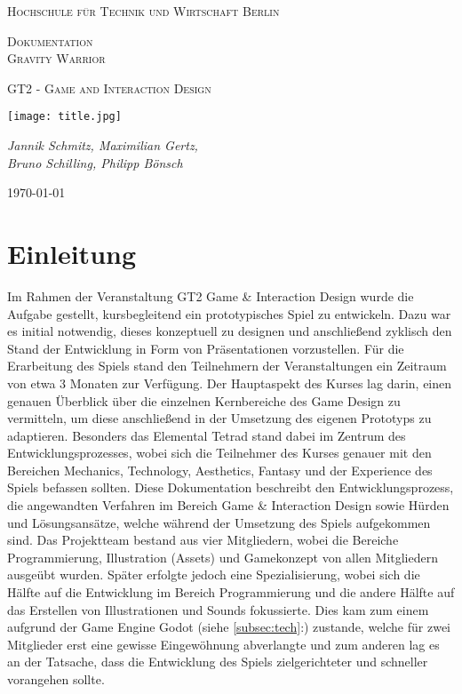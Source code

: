 \documentclass[11pt]{scrartcl}
\begin{document}
\begin{titlepage}
	\centering
	{\scshape\LARGE Hochschule für Technik und Wirtschaft Berlin \par}
	\vspace{1cm}
	{\Huge \scshape{Dokumentation\\ Gravity Warrior}\par}
	\vspace{1cm}
	{\scshape\Large GT2 - Game and Interaction Design\par}
	\vspace{2cm}
	\texttt{[image: title.jpg]}\par\vspace{1cm}
	\vspace{1cm}
	{\large\itshape Jannik Schmitz, Maximilian Gertz,\\Bruno Schilling, Philipp Bönsch\par}
	\vfill
	
	{\large \today\par}
\end{titlepage}

\lstset{basicstyle=\ttfamily\small,breaklines=true}
\newpage
\tableofcontents
\newpage
\section{Einleitung}
Im Rahmen der Veranstaltung GT2 Game \& Interaction Design wurde die Aufgabe gestellt, kursbegleitend ein prototypisches Spiel zu entwickeln. Dazu war es initial notwendig, dieses konzeptuell zu designen und anschließend zyklisch den Stand der Entwicklung in Form von Präsentationen vorzustellen. Für die Erarbeitung des Spiels stand den Teilnehmern der Veranstaltungen ein Zeitraum von etwa 3 Monaten zur Verfügung. Der Hauptaspekt des Kurses lag darin, einen genauen Überblick über die einzelnen Kernbereiche des Game Design zu vermitteln, um diese anschließend in der Umsetzung des eigenen Prototyps zu adaptieren. Besonders das Elemental Tetrad\cite[~p.41]{S2014} stand dabei im Zentrum des Entwicklungsprozesses, wobei sich die Teilnehmer des Kurses genauer mit den Bereichen Mechanics, Technology, Aesthetics, Fantasy und der Experience des Spiels befassen sollten.
Diese Dokumentation beschreibt den Entwicklungsprozess, die angewandten Verfahren im Bereich Game \& Interaction Design sowie Hürden und Lösungsansätze, welche während der Umsetzung des Spiels aufgekommen sind. Das Projektteam bestand aus vier Mitgliedern, wobei die Bereiche Programmierung, Illustration (Assets) und Gamekonzept von allen Mitgliedern ausgeübt wurden. Später erfolgte jedoch eine Spezialisierung, wobei sich die Hälfte auf die Entwicklung im Bereich Programmierung und die andere Hälfte auf das Erstellen von Illustrationen und Sounds fokussierte. Dies kam zum einem aufgrund der Game Engine Godot (siehe \autoref{subsec:tech}:) zustande, welche für zwei Mitglieder erst eine gewisse Eingewöhnung abverlangte und zum anderen lag es an der Tatsache, dass die Entwicklung des Spiels zielgerichteter und schneller vorangehen sollte.
\end{document}
